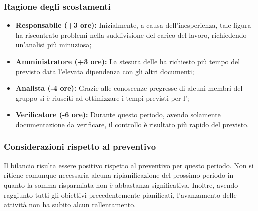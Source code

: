 \subsubsection{Ragione degli scostamenti} \label{subsubsection:ragione_scostamenti}
\begin{itemize}
    \item \textbf{Responsabile (+3 ore):} Inizialmente, a causa dell'inesperienza, tale figura ha riscontrato problemi nella suddivisione del carico del lavoro, richiedendo un'analisi più minuziosa;
    \item \textbf{Amministratore (+3 ore):} La stesura delle \docNameNdP ha richiesto più tempo del previsto data l'elevata dipendenza con gli altri documenti;
    \item \textbf{Analista (-4 ore):} Grazie alle conoscenze pregresse di alcuni membri del gruppo si è riusciti ad ottimizzare i tempi previsti per l'\docNameAdR;
    \item \textbf{Verificatore (-6 ore):} Durante questo periodo, avendo solamente documentazione da verificare, il controllo è risultato più rapido del previsto.
\end{itemize}

\subsubsection{Considerazioni rispetto al preventivo} \label{subsubsection:considerazioni_finali}
Il bilancio risulta essere positivo rispetto al preventivo per questo periodo. Non si ritiene comunque necessaria alcuna ripianificazione del prossimo periodo in quanto la somma risparmiata non è abbastanza significativa.
Inoltre, avendo raggiunto tutti gli obiettivi precedentemente pianificati, l'avanzamento delle attività non ha subito alcun rallentamento.
\pagebreak

